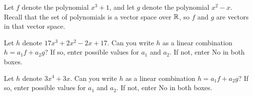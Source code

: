 

\edXsolution{ 
}

\endedxproblem



Let $f$ denote the polynomial $x^3  + 1$, and let $g$ denote the
polynomial $x^2 - x$.  Recall that the set of polynomials is a vector space over $\mathbb R$, so $f$ and $g$
are vectors in that vector space.  

Let $h$ denote $17x^3 + 2x^2 - 2x + 17$.
Can you write $h$  as a linear combination $h = a_1 f + a_2 g$?  If so, enter possible values for $a_1$ and
$a_2$.  If not, enter No in both boxes.  


Let $h$ denote $3x^4 + 3x$.
Can you write $h$  as a linear combination $h = a_1 f + a_2 g$?  If so, enter possible values for $a_1$ and
$a_2$.  If not, enter No in both boxes.  


\edXsolution{ 
}









\endedxvertical






